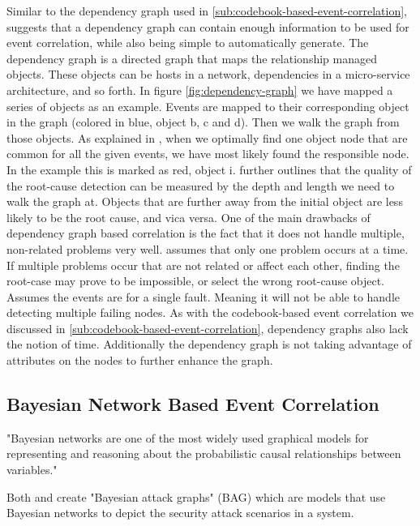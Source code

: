 Similar to the dependency graph used in \ref{sub:codebook-based-event-correlation}, \cite{Gruschke_1998} suggests that a dependency graph can contain enough information to be used for event correlation, while also being simple to automatically generate. The dependency graph is a directed graph that maps the relationship managed objects. These objects can be hosts in a network, dependencies in a micro-service architecture, and so forth.
In figure \ref{fig:dependency-graph} we have mapped a series of objects as an example. Events are mapped to their corresponding object in the graph (colored in blue, object b, c and d). Then we walk the graph from those objects. As explained in \cite{Gruschke_1998}, when we optimally find one object node that are common for all the given events, we have most likely found the responsible node. In the example this is marked as red, object i.
\cite{Gruschke_1998} further outlines that the quality of the root-cause detection can be measured by the depth and length we need to walk the graph at. Objects that are further away from the initial object are less likely to be the root cause, and vica versa.
One of the main drawbacks of dependency graph based correlation is the fact that it does not handle multiple, non-related problems very well. \cite{Gruschke_1998} assumes that only one problem occurs at a time. If multiple problems occur that are not related or affect each other, finding the root-case may prove to be impossible, or select the wrong root-cause object.
Assumes the events are for a single fault. Meaning it will not be able to handle detecting multiple failing nodes.
As with the codebook-based event correlation we discussed in \ref{sub:codebook-based-event-correlation}, dependency graphs also lack the notion of time. Additionally the dependency graph is not taking advantage of attributes on the nodes to further enhance the graph.

\subsection{Bayesian Network Based Event Correlation}

"Bayesian networks are one of the most widely used graphical models for representing and reasoning about the probabilistic causal relationships between variables." \cite{Kavousi_2014}

Both \cite{Kavousi_2014} and \cite{Qin_2004} create "Bayesian attack graphs" (BAG) which are models that use Bayesian networks to depict the security attack scenarios in a system.

